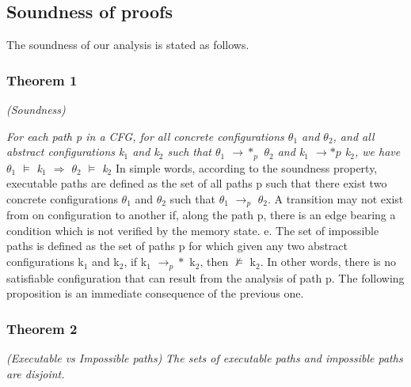 \subsection{Soundness of proofs}
The soundness of our analysis is stated as follows.
\vskip 0.1in
\subsubsection{Theorem 1 }\textit{(Soundness)}
\vskip 0.1in

\textit{For each path p in a CFG, for all concrete configurations $\theta_1$
	and $\theta_2$, and all abstract configurations k$_1$ and k$_2$ such that
	$\theta_1$ $\rightarrow*_p$ $\theta_2$ and 
	k$_1$ $\rightarrow*p$ k$_2$, we have $\theta_1$ $\vDash$ k$_1$ $\Longrightarrow$ $\theta_2$ $\vDash$ k$_2$}
\vskip 0.2in
In simple words, according to the soundness property, executable paths are defined as the set of all paths p such that there exist two concrete configurations $\theta_1$ and $\theta_2$ such that $\theta_1$ $\rightarrow_p$ $\theta_2$. A transition may not exist from on configuration to another if, along the path p, there is an edge bearing a condition which is not verified by the memory state. e. The set of impossible paths is defined as the set of paths p for which
given any two abstract configurations k$_1$ and k$_2$, if k$_1$ $\rightarrow_p*$ k$_2$, then
$\nvDash$ k$_2$. In other words, there is no satisfiable configuration that can
result from the analysis of path p. The following proposition is an
immediate consequence of the previous one.
\vskip 0.2in

\subsubsection{Theorem 2 }\textit{(Executable vs Impossible paths)}
\vskip 0.1in
\textit{The sets of
	executable paths and impossible paths are disjoint.}

